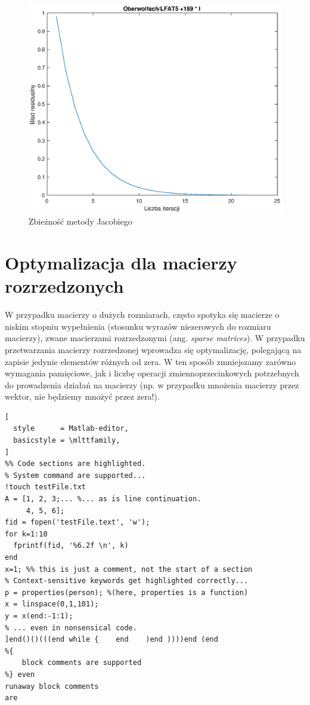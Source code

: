 \documentclass[a4paper,margin=1.54cm]{article}
\begin{document}
\begin{figure}[!ht]
\centering
\includegraphics[scale=0.3]{5zbiega.eps}
\caption{Zbieżność metody Jacobiego}
\label{fig:zrzut1}
\end{figure}


\section{Optymalizacja dla macierzy rozrzedzonych}

W przypadku macierzy o dużych rozmiarach, często spotyka się macierze o niskim stopniu wypełnienia (stosunku wyrazów niezerowych do rozmiaru macierzy), zwane macierzami rozrzedzonymi (ang. \textit{sparse matrices}). W przypadku przetwarzania macierzy rozrzedzonej wprowadza się optymalizację, polegającą na zapisie jedynie elementów różnych od zera. W ten sposób zmniejszamy zarówno wymagania pamięciowe, jak i liczbę operacji zmiennoprzecinkowych potrzebnych do prowadzenia działań na macierzy (np. w przypadku mnożenia macierzy przez wektor, nie będziemy mnożyć przez zera!)\cite{mimuwprzykre}.

\begin{lstlisting}[
  style      = Matlab-editor,
  basicstyle = \mlttfamily,
]
%% Code sections are highlighted.
% System command are supported...
!touch testFile.txt
A = [1, 2, 3;... %... as is line continuation.
     4, 5, 6];
fid = fopen('testFile.text', 'w');
for k=1:10
  fprintf(fid, '%6.2f \n', k)
end
x=1; %% this is just a comment, not the start of a section
% Context-sensitive keywords get highlighted correctly...
p = properties(person); %(here, properties is a function)
x = linspace(0,1,101);
y = x(end:-1:1);
% ... even in nonsensical code.
]end()()(((end while {    end    )end ))))end (end
%{
    block comments are supported
%} even
runaway block comments
are
\end{lstlisting}
\end{document}
